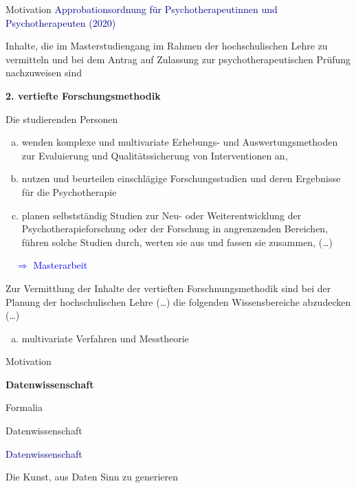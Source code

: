 \documentclass[
  8pt,
  ignorenonframetext,
]{beamer}
\providecommand{\tightlist}{%
  \setlength{\itemsep}{0pt}\setlength{\parskip}{0pt}}
\begin{document}
\begin{frame}{Motivation}
\protect\hypertarget{motivation-6}{}
\textcolor{darkblue}{Approbationsordnung für Psychotherapeutinnen und Psychotherapeuten (2020)}

\small

Inhalte, die im Masterstudiengang im Rahmen der hochschulischen Lehre zu
vermitteln und bei dem Antrag auf Zulassung zur psychotherapeutischen
Prüfung nachzuweisen sind \vspace{2mm}

\footnotesize

\noindent \textbf{2. vertiefte Forschungsmethodik}

Die studierenden Personen

\begin{enumerate}
[a)]
\item
  wenden komplexe und multivariate Erhebungs- und Auswertungsmethoden
  zur Evaluierung und Qualitätssicherung von Interventionen an,
\item
  nutzen und beurteilen einschlägige Forschungsstudien und deren
  Ergebnisse für die Psychotherapie
\item
  planen selbstständig Studien zur Neu- oder Weiterentwicklung der
  Psychotherapieforschung oder der Forschung in angrenzenden Bereichen,
  führen solche Studien durch, werten sie aus und fassen sie zusammen,
  (\ldots)
\end{enumerate}

\textcolor{blue}{$\quad\Rightarrow$ Masterarbeit}

Zur Vermittlung der Inhalte der vertieften Forschnungsmethodik sind bei
der Planung der hochschulischen Lehre (\ldots) die folgenden
Wissensbereiche abzudecken (\ldots)

\begin{enumerate}
[a)]
\tightlist
\item
  multivariate Verfahren und Messtheorie
\end{enumerate}
\end{frame}

\begin{frame}{}
\protect\hypertarget{section-7}{}
\vfill
\Large

Motivation

\textbf{Datenwissenschaft}

Formalia \vfill
\end{frame}

\begin{frame}{Datenwissenschaft}
\protect\hypertarget{datenwissenschaft}{}
\vfill

\center
\huge

\textcolor{darkblue}{Datenwissenschaft} \vspace{5mm}

\Large

Die Kunst, aus Daten Sinn zu generieren
\end{frame}
\end{document}
